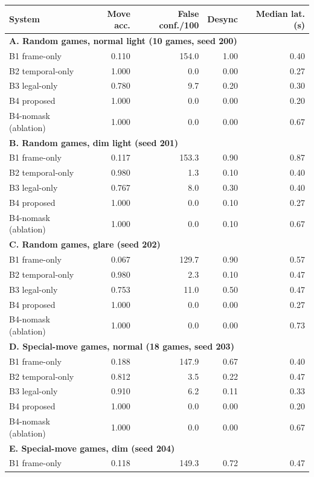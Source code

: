 \begin{longtable}{p{}rrrr}
\toprule
System & Move acc. & False conf./100 & Desync & Median lat. (s)\\ \midrule
\endhead
\multicolumn{5}{l}{\textbf{A. Random games, normal light (10 games, seed 200)}}\\
B1 frame-only & 0.110 & 154.0 & 1.00 & 0.40\\
B2 temporal-only & 1.000 & 0.0 & 0.00 & 0.27\\
B3 legal-only & 0.780 & 9.7 & 0.20 & 0.30\\
B4 proposed & 1.000 & 0.0 & 0.00 & 0.20\\
B4-nomask (ablation) & 1.000 & 0.0 & 0.00 & 0.67\\
\midrule
\multicolumn{5}{l}{\textbf{B. Random games, dim light (seed 201)}}\\
B1 frame-only & 0.117 & 153.3 & 0.90 & 0.87\\
B2 temporal-only & 0.980 & 1.3 & 0.10 & 0.40\\
B3 legal-only & 0.767 & 8.0 & 0.30 & 0.40\\
B4 proposed & 1.000 & 0.0 & 0.10 & 0.27\\
B4-nomask (ablation) & 1.000 & 0.0 & 0.10 & 0.67\\
\midrule
\multicolumn{5}{l}{\textbf{C. Random games, glare (seed 202)}}\\
B1 frame-only & 0.067 & 129.7 & 0.90 & 0.57\\
B2 temporal-only & 0.980 & 2.3 & 0.10 & 0.47\\
B3 legal-only & 0.753 & 11.0 & 0.50 & 0.47\\
B4 proposed & 1.000 & 0.0 & 0.00 & 0.27\\
B4-nomask (ablation) & 1.000 & 0.0 & 0.00 & 0.73\\
\midrule
\multicolumn{5}{l}{\textbf{D. Special-move games, normal (18 games, seed 203)}}\\
B1 frame-only & 0.188 & 147.9 & 0.67 & 0.40\\
B2 temporal-only & 0.812 & 3.5 & 0.22 & 0.47\\
B3 legal-only & 0.910 & 6.2 & 0.11 & 0.33\\
B4 proposed & 1.000 & 0.0 & 0.00 & 0.20\\
B4-nomask (ablation) & 1.000 & 0.0 & 0.00 & 0.67\\
\midrule
\multicolumn{5}{l}{\textbf{E. Special-move games, dim (seed 204)}}\\
B1 frame-only & 0.118 & 149.3 & 0.72 & 0.47\\

\end{longtable}
